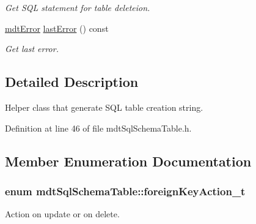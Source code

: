 \begin{DoxyCompactItemize}
\begin{DoxyCompactList}\small\item\em Get SQL statement for table deleteion. \end{DoxyCompactList}\item 
\hypertarget{classmdt_sql_schema_table_a8199d144499e7fd77ad168049a3c2ca7}{
\hyperlink{classmdt_error}{mdtError} \hyperlink{classmdt_sql_schema_table_a8199d144499e7fd77ad168049a3c2ca7}{lastError} () const }
\label{classmdt_sql_schema_table_a8199d144499e7fd77ad168049a3c2ca7}

\begin{DoxyCompactList}\small\item\em Get last error. \end{DoxyCompactList}\end{DoxyCompactItemize}


\subsection{Detailed Description}
Helper class that generate SQL table creation string. 

Definition at line 46 of file mdtSqlSchemaTable.h.



\subsection{Member Enumeration Documentation}
\hypertarget{classmdt_sql_schema_table_a1738e443f03dc69b914edb967cb911be}{
\subsubsection[{foreignKeyAction\_\-t}]{\setlength{\rightskip}{0pt plus 5cm}enum {\bf mdtSqlSchemaTable::foreignKeyAction\_\-t}}}
\label{classmdt_sql_schema_table_a1738e443f03dc69b914edb967cb911be}


Action on update or on delete. 


